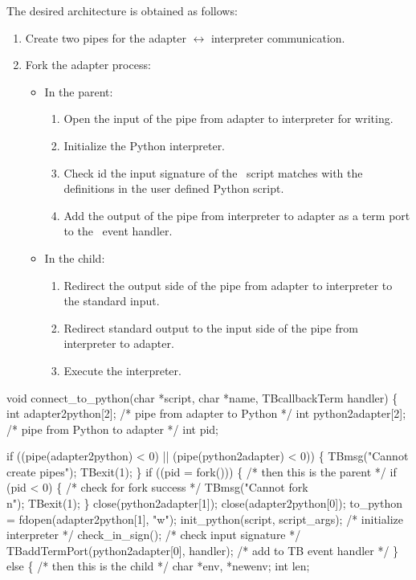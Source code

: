 The desired architecture is obtained as follows:
\begin{enumerate}
\item Create two pipes for the adapter $\leftrightarrow$ interpreter
  communication.
\item Fork the adapter process:
  \begin{itemize}
  \item In the parent:
    \begin{enumerate}
    \item Open the input of the pipe from adapter to interpreter for
      writing.
    \item Initialize the Python interpreter.
    \item Check id the input signature of the \TB\ script matches with
      the definitions in the user defined Python script.
    \item Add the output of the pipe from interpreter to adapter as a
      term port to the \TB\ event handler.
    \end{enumerate}
  \item In the child:
    \begin{enumerate}
    \item Redirect the output side of the pipe from adapter to
      interpreter to the standard input.
    \item Redirect standard output to the input side of the pipe from
      interpreter to adapter.
    \item Execute the interpreter.
    \end{enumerate}
  \end{itemize}
\end{enumerate}

\nwenddocs{}\endmoddef\nwstartdeflinemarkup{}\nwenddeflinemarkup
void connect_to_python(char *script, char *name, TBcallbackTerm handler) \{
  int adapter2python[2];                /* pipe from adapter to Python */
  int python2adapter[2];                /* pipe from Python to adapter */
  int pid;

  if ((pipe(adapter2python) < 0) || (pipe(python2adapter) < 0)) \{
    TBmsg("Cannot create pipes"); 
    TBexit(1);
  \}
  if ((pid = fork())) \{                         /* then this is the parent */
    if (pid < 0) \{                              /* check for fork success */
      TBmsg("Cannot fork\\n"); TBexit(1);
    \}
    close(python2adapter[1]); close(adapter2python[0]);
    to_python = fdopen(adapter2python[1], "w");
    init_python(script, script_args);           /* initialize interpreter */
    check_in_sign();                            /* check input signature */
    TBaddTermPort(python2adapter[0], handler);  /* add to TB event handler */
  \} else \{                              /* then this is the child */
    char *env, *newenv;
    int len;

